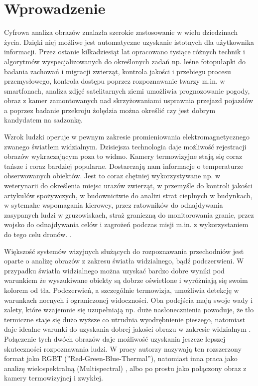 \chapter{Wprowadzenie}
Cyfrowa analiza obrazów znalazła szerokie zastosowanie w wielu dziedzinach życia. Dzięki niej możliwe jest automatyczne uzyskanie istotnych dla użytkownika informacji. Przez ostanie kilkadziesiąt lat opracowano tysiące różnych technik i algorytmów wyspecjalizowanych do określonych zadań np. leśne fotopułapki do badania zachowań i migracji zwierząt, kontrola jakości i przebiegu procesu przemysłowego, kontrola dostępu poprzez rozpoznawanie twarzy m.in. w smartfonach, analiza zdjęć satelitarnych ziemi umożliwia prognozowanie pogody, obraz z kamer zamontowanych nad skrzyżowaniami usprawnia przejazd pojazdów a poprzez badanie przekroju żołędzia można określić czy jest dobrym kandydatem na sadzonkę. 

Wzrok ludzki operuje w pewnym zakresie promieniowania elektromagnetycznego zwanego światłem widzialnym. Dzisiejsza technologia daje możliwość rejestracji obrazów wykraczającym poza to widmo. Kamery termowizyjne stają się coraz tańsze i coraz bardziej popularne. Dostarczają nam informacje o temperaturze obserwowanych obiektów. Jest to coraz chętniej wykorzystywane np. w weterynarii do określenia miejsc urazów zwierząt, w przemyśle do kontroli jakości artykułów spożywczych, w budownictwie do analizi strat cieplnych w budynkach, w sytemahc wspomagania kierowcy, przez ratowników do odnajdywania zasypanych ludzi w gruzowiskach, straż graniczną do monitorowania granic, przez wojsko do odnajdywania celów i zagrożeń podczas misji m.in. z wykorzystaniem do tego celu dronów. \cite{gade2014thermal}. 

Większość systemów wizyjnych służących do rozpoznawania przechodniów jest oparte o analizę obrazów z zakresu światła widzialnego, bądź podczerwieni. 
W przypadku światła widzialnego można uzyskać bardzo dobre wyniki pod warunkiem że wyszukiwane obiekty są dobrze oświetlone i wyróżniają się swoim kolorem od tła. 
Podczerwień, a szczególnie termowizja, umożliwia detekcję w warunkach nocnych i ograniczonej widoczności.
Oba podejścia mają swoje wady i zalety, które wzajemnie się uzupełniają np. duże nasłonecznienia powoduje, że tło termiczne staje się dużo wyższe co utrudnia wyodrębnienie pieszego, natomiast daje idealne warunki do uzyskania dobrej jakości obrazu w zakresie widzialnym \cite{lee2015robust}. 
Połączenie tych dwóch obrazów daje możliwość uzyskania jeszcze lepszej skuteczności rozpoznawania ludzi. W pracy \cite{st2007combination} autorzy nazywają ten rozszerzony format jako RGBT (''Red-Green-Blue-Thermal''), natomiast inna praca jako analizę wielospektralną (Multispectral) \cite{hwang2015multispectral}, albo po prostu jako połączony obraz z kamery termowizyjnej i zwykłej\cite{lee2015robust}. 

